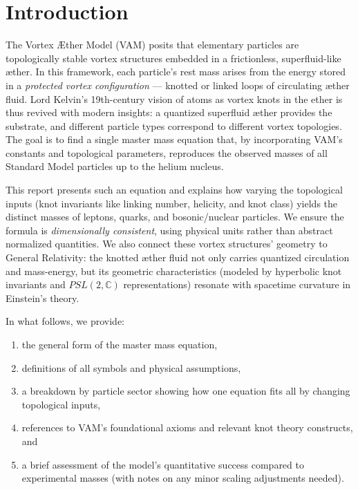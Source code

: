 \section{Introduction}

    The Vortex Æther Model (VAM) posits that elementary particles are topologically stable vortex structures embedded in a frictionless, superfluid-like æther. In this framework, each particle’s rest mass arises from the energy stored in a \textit{protected vortex configuration} — knotted or linked loops of circulating æther fluid. Lord Kelvin’s 19th-century vision of atoms as vortex knots in the ether is thus revived with modern insights: a quantized superfluid æther provides the substrate, and different particle types correspond to different vortex topologies. The goal is to find a single master mass equation that, by incorporating VAM’s constants and topological parameters, reproduces the observed masses of all Standard Model particles up to the helium nucleus.

    This report presents such an equation and explains how varying the topological inputs (knot invariants like linking number, helicity, and knot class) yields the distinct masses of leptons, quarks, and bosonic/nuclear particles. We ensure the formula is \textit{dimensionally consistent}, using physical units rather than abstract normalized quantities. We also connect these vortex structures’ geometry to General Relativity: the knotted æther fluid not only carries quantized circulation and mass-energy, but its geometric characteristics (modeled by hyperbolic knot invariants and $PSL(2,\mathbb{C})$ representations) resonate with spacetime curvature in Einstein’s theory.

    In what follows, we provide:
    \begin{enumerate}
        \item the general form of the master mass equation,
        \item definitions of all symbols and physical assumptions,
        \item a breakdown by particle sector showing how one equation fits all by changing topological inputs,
        \item references to VAM’s foundational axioms and relevant knot theory constructs, and
        \item a brief assessment of the model’s quantitative success compared to experimental masses (with notes on any minor scaling adjustments needed).
    \end{enumerate}

